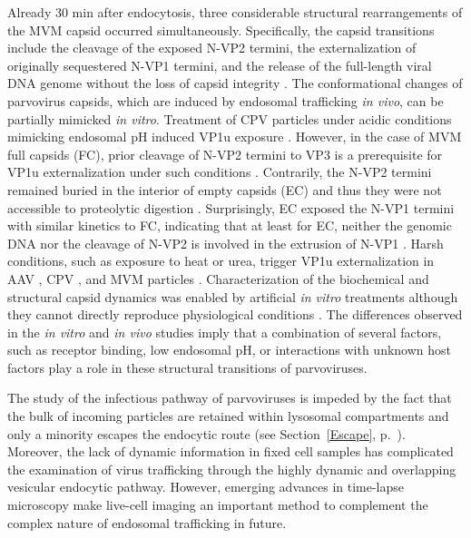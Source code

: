 Already 30 min after endocytosis, three considerable structural rearrangements of the MVM capsid occurred simultaneously. Specifically, the capsid transitions include the cleavage of the exposed N-VP2 termini, the externalization of originally sequestered N-VP1 termini, and the release of the full-length viral DNA genome without the loss of capsid integrity \cite{pmid16379002}. The conformational changes of parvovirus capsids, which are induced by endosomal trafficking \textit{in vivo}, can be partially mimicked \textit{in vitro}. Treatment of CPV particles under acidic conditions mimicking endosomal pH induced VP1u exposure \cite{pmid14644609}. However, in the case of MVM full capsids (FC), prior cleavage of N-VP2 termini to VP3 is a prerequisite for VP1u externalization under such conditions \cite{pmid9927584, pmid16352540}. Contrarily, the N-VP2 termini remained buried in the interior of empty capsids (EC) and thus they were not accessible to proteolytic digestion \cite{pmid16379002}. Surprisingly, EC exposed the N-VP1 termini with similar kinetics to FC, indicating that at least for EC, neither the genomic DNA nor the cleavage of N-VP2 is involved in the extrusion of N-VP1 \cite{pmid9927584, pmid16379002}. Harsh conditions, such as exposure to heat or urea, trigger VP1u externalization in AAV \cite{pmid15827144}, CPV \cite{pmid11799183, pmid9770425}, and MVM particles \cite{pmid9927584, pmid19955311}. Characterization of the biochemical and structural capsid dynamics was enabled by artificial \textit{in vitro} treatments although they cannot directly reproduce physiological conditions \cite{pmid9927584, pmid19955311, pmid15827144, pmid11799183}. The differences observed in the \textit{in vitro} and \textit{in vivo} studies imply that a combination of several factors, such as receptor binding, low endosomal pH, or interactions with unknown host factors play a role in these structural transitions of parvoviruses.       

The study of the infectious pathway of parvoviruses is impeded by the fact that the bulk of incoming particles are retained within lysosomal compartments and only a minority escapes the endocytic route (see Section~\ref{Escape}, p.~\pageref{Escape}). Moreover, the lack of dynamic information in fixed cell samples has complicated the examination of virus trafficking through the highly dynamic and overlapping vesicular endocytic pathway. However, emerging advances in time-lapse microscopy make live-cell imaging an important method to complement the complex nature of endosomal trafficking in future.


